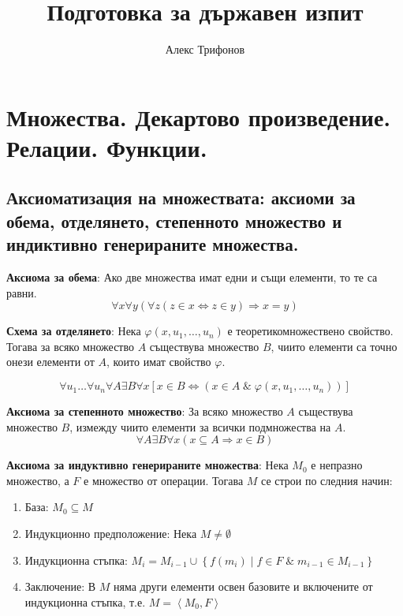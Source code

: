 \documentclass{article}
\renewcommand{\\}{\newline}
\newcommand{\amp}{\;\&\;}
\newcommand{\sep}{\;|\;}
\begin{document}
\title{Подготовка за държавен изпит}
\author{Алекс Трифонов}
\date{}
\maketitle{}
\section{Множества. Декартово произведение. Релации. Функции.}
  \subsection{Аксиоматизация на множествата: аксиоми за обема, отделянето, степенното множество и индиктивно генерираните множества. }
    \textbf{Аксиома за обема}: Ако две множества имат едни и същи елементи, то те са равни. 
    \[
      \forall x \forall y \left( \forall z \left( z \in x \iff z \in y \right) \Rightarrow x = y \right)
    \] 

    \textbf{Схема за отделянето}: Нека \(\varphi(x, u_1, \dots, u_n)\) е теоретикомножествено свойство. Тогава за всяко множество \(A\) съществува множество \(B\), чиито елементи са точно онези елементи от \(A\), които имат свойство \(\varphi\). 

    \[
      \forall u_1\dots\forall u_n \forall A \exists B \forall x \left[ x \in B \iff (x \in A \amp \varphi(x, u_1, \dots, u_n)) \right]
    \]   

    \textbf{Аксиома за степенното множество}: За всяко множество \(A\) съществува множество \(B\), измежду чиито елементи за всички подмножества на \(A\). 
    \[
      \forall A \exists B \forall x \left( x \subseteq A \Rightarrow x \in B \right)
    \] 

    \textbf{Аксиома за индуктивно генерираните множества}: Нека \(M_0\) е непразно множество, а \(F\) е множество от операции. Тогава \(M\) се строи по следния начин:
    \begin{enumerate}[label = \arabic*., leftmargin=*]
        \item База: \(M_0 \subseteq M\) 
        \item Индукционно предположение: Нека \(M \not= \emptyset\)
        \item Индукционна стъпка: \(M_i  = M_{i-1} \cup \left\{ f(m_i)  \sep f \in  F \amp m_{i-1} \in M_{i-1}  \right\}\)   
        \item Заключение: В \(M\) няма други елементи освен базовите и включените от индукционна стъпка, т.е. \(M = \left\langle M_{0}, F \right\rangle\)   
    \end{enumerate}
\end{document}
